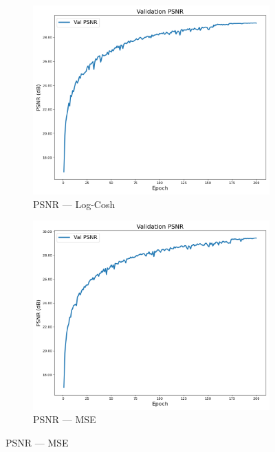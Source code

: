 \begin{figure}[p]
    \begin{subfigure}[b]{0.48\textwidth}
        \includegraphics[width=\textwidth]{img/vae_results/200_epochs_128_ls_logcosh/logcosh_val_psnr.png}
        \caption{PSNR — Log-Cosh}
    \end{subfigure}
    \hfill
    \begin{subfigure}[b]{0.48\textwidth}
        \includegraphics[width=\textwidth]{img/vae_results/200_epochs_128_ls_mse/mse_val_psnr.png}
        \caption{PSNR — MSE}
    \end{subfigure}


\end{figure}
